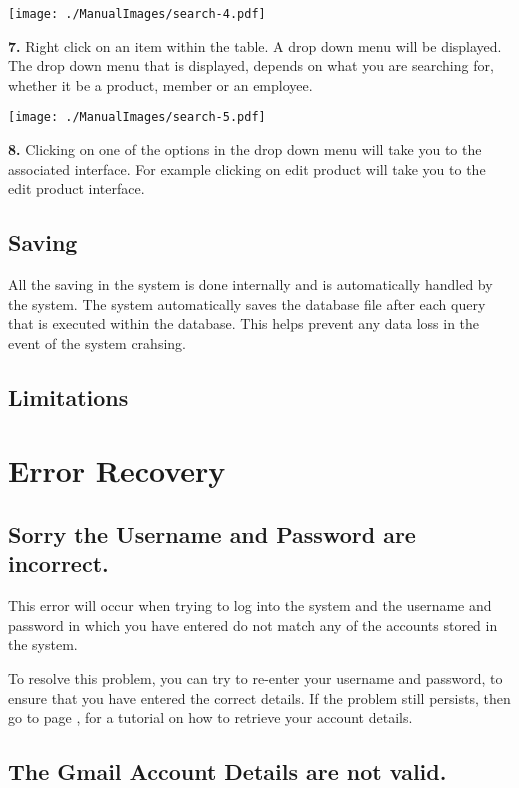 \texttt{[image: ./ManualImages/search-4.pdf]}

\textbf{7.} Right click on an item within the table. A drop down menu will be displayed. The drop down menu that is displayed, depends on what you are searching for, whether it be a product, member or an employee.

\texttt{[image: ./ManualImages/search-5.pdf]}

\textbf{8.} Clicking on one of the options in the drop down menu will take you to the associated interface. For example clicking on edit product will take you to the edit product interface.

\subsection{Saving}

All the saving in the system is done internally and is automatically handled by the system. The system automatically saves the database file after each query that is executed within the database. This helps prevent any data loss in the event of the system crahsing.

\subsection{Limitations}

\section{Error Recovery}

\subsection{Sorry the Username and Password are incorrect.}

This error will occur when trying to log into the system and the username and password in which you have entered do not match any of the accounts stored in the system.

To resolve this problem, you can try to re-enter your username and password, to ensure that you have entered the correct details. If the problem still persists, then go to page \pageref{fig:Forgetting Your User-name or Password}, for a tutorial on how to retrieve your account details.

\subsection{The Gmail Account Details are not valid.}

